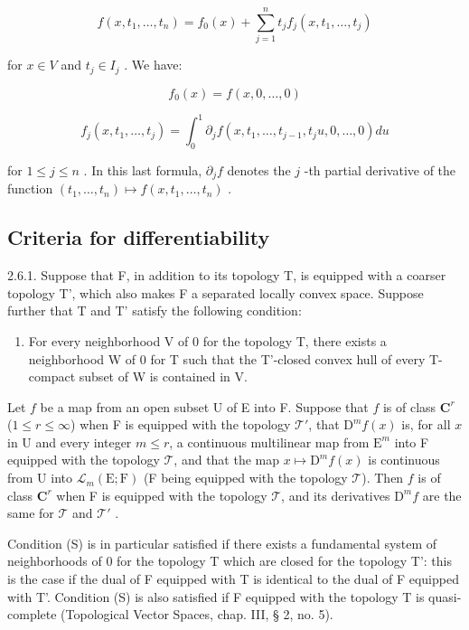 \[
f (x, t _ {1}, \dots , t _ {n}) = f _ {0} (x) + \sum_ {j = 1} ^ {n} t _ {j} f _ {j} (x, t _ {1}, \dots , t _ {j})
\]

for \(x \in V\) and \(t_j \in I_j\) . We have:

\[
f _ {0} (x) = f (x, 0, \dots , 0)
\]

\[
f _ {j} (x, t _ {1}, \dots , t _ {j}) = \int_ {0} ^ {1} \partial_ {j} f (x, t _ {1}, \dots , t _ {j - 1}, t _ {j} u, 0, \dots , 0) d u
\]

for \(1 \leqslant j \leqslant n\) . In this last formula, \(\partial_j f\) denotes the \(j\) -th partial derivative of the function \((t_1, \ldots, t_n) \mapsto f(x, t_1, \ldots, t_n)\) .

\subsection{Criteria for differentiability}

2.6.1. Suppose that F, in addition to its topology T, is equipped with a coarser topology T', which also makes F a separated locally convex space. Suppose further that T and T' satisfy the following condition:

\begin{enumerate}
\def\labelenumi{(\Alph{enumi})}
\setcounter{enumi}{18}
\tightlist
\item
  For every neighborhood V of 0 for the topology T, there exists a neighborhood W of 0 for T such that the T'-closed convex hull of every T-compact subset of W is contained in V.
\end{enumerate}

Let \(f\) be a map from an open subset U of E into F. Suppose that \(f\) is of class \(\mathbf{C}^{r}\) (\(1 \leqslant r \leqslant \infty\)) when F is equipped with the topology \(\mathcal{T}'\), that \(\mathrm{D}^{m}f(x)\) is, for all \(x\) in U and every integer \(m \leqslant r\), a continuous multilinear map from \(\mathrm{E}^{m}\) into F equipped with the topology \(\mathcal{T}\), and that the map \(x \mapsto \mathrm{D}^{m}f(x)\) is continuous from U into \(\mathcal{L}_{m}(\mathrm{E};\mathrm{F})\) (F being equipped with the topology \(\mathcal{T}\)). Then \(f\) is of class \(\mathbf{C}^{r}\) when F is equipped with the topology \(\mathcal{T}\), and its derivatives \(\mathrm{D}^{m}f\) are the same for \(\mathcal{T}\) and \(\mathcal{T}'\) .

Condition (S) is in particular satisfied if there exists a fundamental system of neighborhoods of 0 for the topology T which are closed for the topology T': this is the case if the dual of F equipped with T is identical to the dual of F equipped with T'. Condition (S) is also satisfied if F equipped with the topology T is quasi-complete (Topological Vector Spaces, chap. III, § 2, no. 5).

